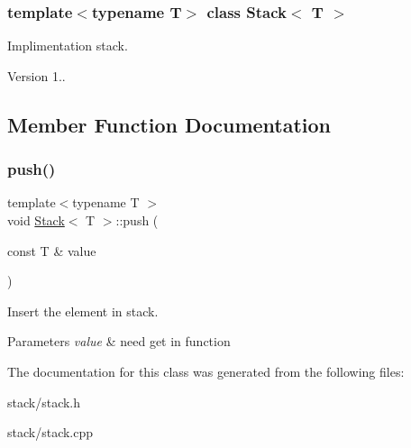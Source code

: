 \subsubsection*{template$<$typename T$>$\newline
class Stack$<$ T $>$}

Implimentation stack. 

\begin{DoxyVersion}{Version}
1.. 
\end{DoxyVersion}


\subsection{Member Function Documentation}
\mbox{\label{classStack_a7b0f0506fd1cd7ec5756bb2b51ff908d}} 
\subsubsection{\texorpdfstring{push()}{push()}}
{\footnotesize\ttfamily template$<$typename T $>$ \\
void \hyperlink{classStack}{Stack}$<$ T $>$\+::push (\begin{DoxyParamCaption}\item[{const T \&}]{value }\end{DoxyParamCaption})}



Insert the element in stack. 


\begin{DoxyParams}{Parameters}
{\em value} & need get in function \\
\hline
\end{DoxyParams}


The documentation for this class was generated from the following files\+:\begin{DoxyCompactItemize}
\item 
stack/stack.\+h\item 
stack/stack.\+cpp\end{DoxyCompactItemize}
